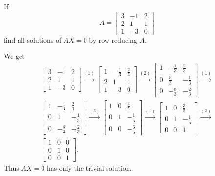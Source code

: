  If
\begin{equation*}
  A =
  \begin{bmatrix}
    3 & -1 & 2 \\
    2 & 1 & 1 \\
    1 & -3 & 0
  \end{bmatrix}
\end{equation*}
find all solutions of $AX = 0$ by row-reducing $A$.
\begin{solution}
  We get
  \begin{gather*}
    \begin{bmatrix}
      3 & -1 & 2 \\[3pt]
      2 & 1 & 1 \\[3pt]
      1 & -3 & 0
    \end{bmatrix}
    \xrightarrow{(1)}
    \begin{bmatrix}
      1 & -\frac13 & \frac23 \\[3pt]
      2 & 1 & 1 \\[3pt]
      1 & -3 & 0
    \end{bmatrix}
    \xrightarrow{(2)}
    \begin{bmatrix}
      1 & -\frac13 & \frac23 \\[3pt]
      0 & \frac53 & -\frac13 \\[3pt]
      0 & -\frac83 & -\frac23
    \end{bmatrix}
    \xrightarrow{(1)} \\
    \begin{bmatrix}
      1 & -\frac13 & \frac23 \\[3pt]
      0 & 1 & -\frac15 \\[3pt]
      0 & -\frac83 & -\frac23
    \end{bmatrix}
    \xrightarrow{(2)}
    \begin{bmatrix}
      1 & 0 & \frac35 \\[3pt]
      0 & 1 & -\frac15 \\[3pt]
      0 & 0 & -\frac65
    \end{bmatrix}
    \xrightarrow{(1)}
    \begin{bmatrix}
      1 & 0 & \frac35 \\[3pt]
      0 & 1 & -\frac15 \\[3pt]
      0 & 0 & 1
    \end{bmatrix}
    \xrightarrow{(2)} \\
    \begin{bmatrix}
      1 & 0 & 0 \\
      0 & 1 & 0 \\
      0 & 0 & 1
    \end{bmatrix}.
  \end{gather*}
  Thus $AX = 0$ has only the trivial solution.
\end{solution}
